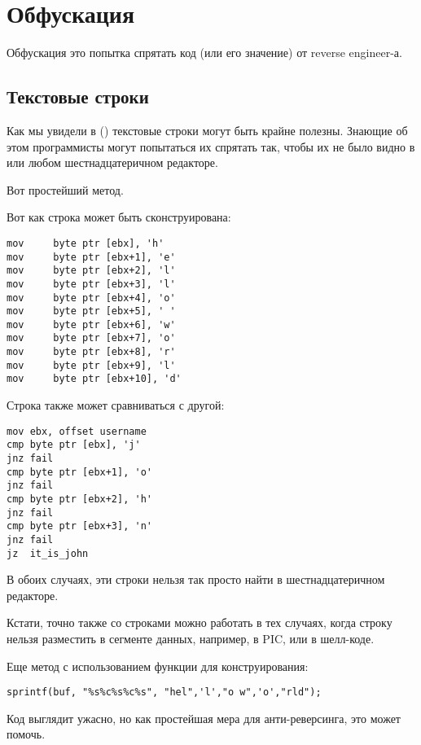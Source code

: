 \section{Обфускация}

Обфускация это попытка спрятать код (или его значение) от reverse engineer-а.

\subsection{Текстовые строки}

Как мы увидели в () текстовые строки могут быть крайне
полезны.
Знающие об этом программисты могут попытаться их спрятать так, чтобы их не было видно в \IDA{} или любом
шестнадцатеричном редакторе.

Вот простейший метод.

Вот как строка может быть сконструирована:

\begin{lstlisting}[style=customasm]
mov     byte ptr [ebx], 'h'
mov     byte ptr [ebx+1], 'e'
mov     byte ptr [ebx+2], 'l'
mov     byte ptr [ebx+3], 'l'
mov     byte ptr [ebx+4], 'o'
mov     byte ptr [ebx+5], ' '
mov     byte ptr [ebx+6], 'w'
mov     byte ptr [ebx+7], 'o'
mov     byte ptr [ebx+8], 'r'
mov     byte ptr [ebx+9], 'l'
mov     byte ptr [ebx+10], 'd'
\end{lstlisting}

Строка также может сравниваться с другой:

\begin{lstlisting}[style=customasm]
mov	ebx, offset username
cmp	byte ptr [ebx], 'j'
jnz	fail
cmp	byte ptr [ebx+1], 'o'
jnz	fail
cmp	byte ptr [ebx+2], 'h'
jnz	fail
cmp	byte ptr [ebx+3], 'n'
jnz	fail
jz	it_is_john
\end{lstlisting}

В обоих случаях, эти строки нельзя так просто найти в шестнадцатеричном редакторе.

Кстати, точно также со строками можно работать в тех случаях, 
когда строку нельзя разместить в сегменте данных, например, в \ac{PIC}, или в шелл-коде.

Еще метод с использованием функции  для конструирования:

\begin{lstlisting}[style=customc]
sprintf(buf, "%s%c%s%c%s", "hel",'l',"o w",'o',"rld");
\end{lstlisting}

Код выглядит ужасно, но как простейшая мера для анти-реверсинга, это может помочь.

